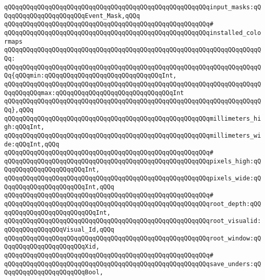 \verb|qQQqqQQqqQQqqQQqqQQqqQQqqQQqqQQqqQQqqQQqqQQqqQQqqQQqqQQqinput_masks:qQQqqQQqqQQqqQQqqQQqqQQqEvent_Mask,qQQq|\newline
\verb|qQQqqQQqqQQqqQQqqQQqqQQqqQQqqQQqqQQqqQQqqQQqqQQqqQQqqQQq#|\newline
\verb|qQQqqQQqqQQqqQQqqQQqqQQqqQQqqQQqqQQqqQQqqQQqqQQqqQQqqQQqinstalled_colormaps|\newline
\verb|qQQqqQQqqQQqqQQqqQQqqQQqqQQqqQQqqQQqqQQqqQQqqQQqqQQqqQQqqQQqqQQqqQQqqQQq:|\newline
\verb|qQQqqQQqqQQqqQQqqQQqqQQqqQQqqQQqqQQqqQQqqQQqqQQqqQQqqQQqqQQqqQQqqQQqqQQq{qQQqmin:qQQqqQQqqQQqqQQqqQQqqQQqqQQqqQQqInt,|\newline
\verb|qQQqqQQqqQQqqQQqqQQqqQQqqQQqqQQqqQQqqQQqqQQqqQQqqQQqqQQqqQQqqQQqqQQqqQQqqQQqqQQqmax:qQQqqQQqqQQqqQQqqQQqqQQqqQQqqQQqInt|\newline
\verb|qQQqqQQqqQQqqQQqqQQqqQQqqQQqqQQqqQQqqQQqqQQqqQQqqQQqqQQqqQQqqQQqqQQqqQQq},qQQq|\newline
\newline
\verb|qQQqqQQqqQQqqQQqqQQqqQQqqQQqqQQqqQQqqQQqqQQqqQQqqQQqqQQqmillimeters_high:qQQqInt,|\newline
\verb|qQQqqQQqqQQqqQQqqQQqqQQqqQQqqQQqqQQqqQQqqQQqqQQqqQQqqQQqmillimeters_wide:qQQqInt,qQQq|\newline
\verb|qQQqqQQqqQQqqQQqqQQqqQQqqQQqqQQqqQQqqQQqqQQqqQQqqQQqqQQq#|\newline
\verb|qQQqqQQqqQQqqQQqqQQqqQQqqQQqqQQqqQQqqQQqqQQqqQQqqQQqqQQqpixels_high:qQQqqQQqqQQqqQQqqQQqqQQqInt,|\newline
\verb|qQQqqQQqqQQqqQQqqQQqqQQqqQQqqQQqqQQqqQQqqQQqqQQqqQQqqQQqpixels_wide:qQQqqQQqqQQqqQQqqQQqqQQqInt,qQQq|\newline
\verb|qQQqqQQqqQQqqQQqqQQqqQQqqQQqqQQqqQQqqQQqqQQqqQQqqQQqqQQq#|\newline
\verb|qQQqqQQqqQQqqQQqqQQqqQQqqQQqqQQqqQQqqQQqqQQqqQQqqQQqqQQqroot_depth:qQQqqQQqqQQqqQQqqQQqqQQqqQQqInt,|\newline
\verb|qQQqqQQqqQQqqQQqqQQqqQQqqQQqqQQqqQQqqQQqqQQqqQQqqQQqqQQqroot_visualid:qQQqqQQqqQQqqQQqVisual_Id,qQQq|\newline
\verb|qQQqqQQqqQQqqQQqqQQqqQQqqQQqqQQqqQQqqQQqqQQqqQQqqQQqqQQqroot_window:qQQqqQQqqQQqqQQqqQQqqQQqXid,|\newline
\verb|qQQqqQQqqQQqqQQqqQQqqQQqqQQqqQQqqQQqqQQqqQQqqQQqqQQqqQQq#|\newline
\verb|qQQqqQQqqQQqqQQqqQQqqQQqqQQqqQQqqQQqqQQqqQQqqQQqqQQqqQQqsave_unders:qQQqqQQqqQQqqQQqqQQqqQQqBool,|\newline
